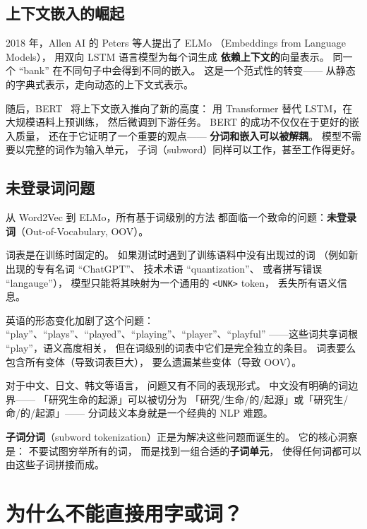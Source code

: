 \subsection{上下文嵌入的崛起}

2018 年，Allen AI 的 Peters 等人提出了 ELMo
（Embeddings from Language Models），
用双向 LSTM 语言模型为每个词生成
\textbf{依赖上下文的}向量表示。
同一个 ``bank'' 在不同句子中会得到不同的嵌入。
这是一个范式性的转变——
从静态的字典式表示，走向动态的上下文式表示。

随后，BERT~\cite{devlin2019bert} 将上下文嵌入推向了新的高度：
用 Transformer 替代 LSTM，在大规模语料上预训练，
然后微调到下游任务。
BERT 的成功不仅仅在于更好的嵌入质量，
还在于它证明了一个重要的观点——
\textbf{分词和嵌入可以被解耦}。
模型不需要以完整的词作为输入单元，
子词（subword）同样可以工作，甚至工作得更好。

\subsection{未登录词问题}

从 Word2Vec 到 ELMo，所有基于词级别的方法
都面临一个致命的问题：\textbf{未登录词}（Out-of-Vocabulary, OOV）。

词表是在训练时固定的。
如果测试时遇到了训练语料中没有出现过的词
（例如新出现的专有名词 ``ChatGPT''、
技术术语 ``quantization''、
或者拼写错误 ``langauge''），
模型只能将其映射为一个通用的 \texttt{<UNK>} token，
丢失所有语义信息。

英语的形态变化加剧了这个问题：
``play''、``plays''、``played''、``playing''、``player''、``playful''
——这些词共享词根 ``play''，语义高度相关，
但在词级别的词表中它们是完全独立的条目。
词表要么包含所有变体（导致词表巨大），
要么遗漏某些变体（导致 OOV）。

对于中文、日文、韩文等语言，
问题又有不同的表现形式。
中文没有明确的词边界——
「研究生命的起源」可以被切分为
「研究/生命/的/起源」或「研究生/命/的/起源」——
分词歧义本身就是一个经典的 NLP 难题。

\textbf{子词分词}（subword tokenization）正是为解决这些问题而诞生的。
它的核心洞察是：
不要试图穷举所有的词，
而是找到一组合适的\textbf{子词单元}，
使得任何词都可以由这些子词拼接而成。

\section{为什么不能直接用字或词？}

